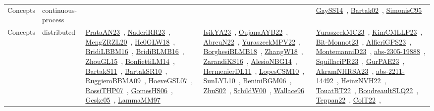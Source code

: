 {\begin{longtable}{lp{3cm}>{\raggedright\arraybackslash}p{6cm}>{\raggedright\arraybackslash}p{6cm}>{\raggedright\arraybackslash}p{8cm}}
Concepts & continuous-process &  &  & \href{papers/GaySS14.pdf}{GaySS14}~\cite{GaySS14}, \href{papers/Bartak02.pdf}{Bartak02}~\cite{Bartak02}, \href{papers/SimonisC95.pdf}{SimonisC95}~\cite{SimonisC95}\\
Concepts & distributed & \href{articles/PrataAN23.pdf}{PrataAN23}~\cite{PrataAN23}, \href{articles/NaderiRR23.pdf}{NaderiRR23}~\cite{NaderiRR23}, \href{articles/MengZRZL20.pdf}{MengZRZL20}~\cite{MengZRZL20}, \href{papers/He0GLW18.pdf}{He0GLW18}~\cite{He0GLW18}, \href{papers/BridiLBBM16.pdf}{BridiLBBM16}~\cite{BridiLBBM16}, \href{articles/BridiBLMB16.pdf}{BridiBLMB16}~\cite{BridiBLMB16}, \href{papers/ZhouGL15.pdf}{ZhouGL15}~\cite{ZhouGL15}, \href{papers/BonfiettiLM14.pdf}{BonfiettiLM14}~\cite{BonfiettiLM14}, \href{articles/BartakS11.pdf}{BartakS11}~\cite{BartakS11}, \href{articles/BartakSR10.pdf}{BartakSR10}~\cite{BartakSR10}, \href{articles/RuggieroBBMA09.pdf}{RuggieroBBMA09}~\cite{RuggieroBBMA09}, \href{papers/HoeveGSL07.pdf}{HoeveGSL07}~\cite{HoeveGSL07}, \href{papers/RossiTHP07.pdf}{RossiTHP07}~\cite{RossiTHP07}, \href{papers/GomesHS06.pdf}{GomesHS06}~\cite{GomesHS06}, \href{papers/Geske05.pdf}{Geske05}~\cite{Geske05}, \href{articles/LammaMM97.pdf}{LammaMM97}~\cite{LammaMM97} & \href{articles/IsikYA23.pdf}{IsikYA23}~\cite{IsikYA23}, \href{papers/OujanaAYB22.pdf}{OujanaAYB22}~\cite{OujanaAYB22}, \href{articles/AbreuN22.pdf}{AbreuN22}~\cite{AbreuN22}, \href{articles/YuraszeckMPV22.pdf}{YuraszeckMPV22}~\cite{YuraszeckMPV22}, \href{articles/BorghesiBLMB18.pdf}{BorghesiBLMB18}~\cite{BorghesiBLMB18}, \href{articles/ZhangW18.pdf}{ZhangW18}~\cite{ZhangW18}, \href{articles/ZarandiKS16.pdf}{ZarandiKS16}~\cite{ZarandiKS16}, \href{papers/AlesioNBG14.pdf}{AlesioNBG14}~\cite{AlesioNBG14}, \href{papers/HermenierDL11.pdf}{HermenierDL11}~\cite{HermenierDL11}, \href{articles/LopesCSM10.pdf}{LopesCSM10}~\cite{LopesCSM10}, \href{papers/SunLYL10.pdf}{SunLYL10}~\cite{SunLYL10}, \href{papers/BeniniBGM06.pdf}{BeniniBGM06}~\cite{BeniniBGM06}, \href{papers/ZhuS02.pdf}{ZhuS02}~\cite{ZhuS02}, \href{articles/SchildW00.pdf}{SchildW00}~\cite{SchildW00}, \href{articles/Wallace96.pdf}{Wallace96}~\cite{Wallace96} & \href{papers/YuraszeckMC23.pdf}{YuraszeckMC23}~\cite{YuraszeckMC23}, \href{papers/KimCMLLP23.pdf}{KimCMLLP23}~\cite{KimCMLLP23}, \href{papers/Bit-Monnot23.pdf}{Bit-Monnot23}~\cite{Bit-Monnot23}, \href{articles/AlfieriGPS23.pdf}{AlfieriGPS23}~\cite{AlfieriGPS23}, \href{articles/MontemanniD23.pdf}{MontemanniD23}~\cite{MontemanniD23}, \href{articles/abs-2305-19888.pdf}{abs-2305-19888}~\cite{abs-2305-19888}, \href{papers/SquillaciPR23.pdf}{SquillaciPR23}~\cite{SquillaciPR23}, \href{articles/GurPAE23.pdf}{GurPAE23}~\cite{GurPAE23}, \href{articles/AkramNHRSA23.pdf}{AkramNHRSA23}~\cite{AkramNHRSA23}, \href{articles/abs-2211-14492.pdf}{abs-2211-14492}~\cite{abs-2211-14492}, \href{articles/HeinzNVH22.pdf}{HeinzNVH22}~\cite{HeinzNVH22}, \href{papers/TouatBT22.pdf}{TouatBT22}~\cite{TouatBT22}, \href{papers/BoudreaultSLQ22.pdf}{BoudreaultSLQ22}~\cite{BoudreaultSLQ22}, \href{papers/Teppan22.pdf}{Teppan22}~\cite{Teppan22}, \href{articles/ColT22.pdf}{ColT22}~\cite{ColT22}, 
\end{longtable}}
